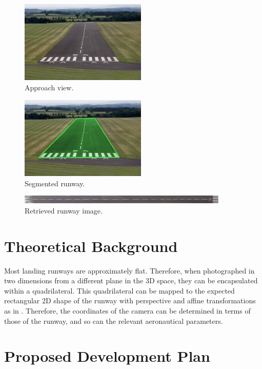 \documentclass[11pt, a4paper]{article}
\begin{document}
\begin{figure}[htp]
    \centering
    \includegraphics[width=6cm]{Images/Approach.jpg}
    \caption{Approach view.}
    \label{fig:Approach}
\end{figure}

\begin{figure}[htp]
    \centering
    \includegraphics[width=6cm]{Images/Segmented.jpg}
    \caption{Segmented runway.}
    \label{fig:Segmented}
\end{figure}

\begin{figure}[htp]
    \centering
    \includegraphics[width=10cm]{Images/Runway.jpg}
    \caption{Retrieved runway image.}
    \label{fig:Runway}
\end{figure}

\section{Theoretical Background}

	Most landing runways are approximately flat. Therefore, when photographed in two dimensions from a different plane in the 3D space, they can be encapsulated within a quadrilateral. This quadrilateral can be mapped to the expected rectangular 2D shape of the runway with perspective and affine transformations as in \cite{Paper}. Therefore, the coordinates of the camera can be determined in terms of those of the runway, and so can the relevant aeronautical parameters.

\section{Proposed Development Plan}
\end{document}
